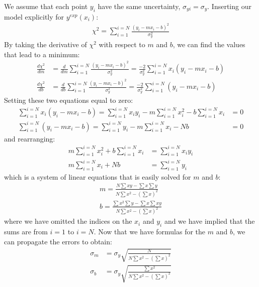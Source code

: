 We assume that each point $y_i$ have the same uncertainty, $ \sigma_{yi} = \sigma_y$. Inserting our model explicitly for $y^{exp}(x_i)$:
\begin{align}
\chi^2=\sum_{i=1}^{i=N}\frac{(y_i-mx_i-b)^2}{\sigma_{y}^2}
\end{align}
By taking the derivative of $\chi^2$ with respect to $m$ and $b$, we can find the values that lead to a minimum:
\begin{align}
\frac{d\chi^2}{dm}&=\frac{d}{dm}\sum_{i=1}^{i=N}\frac{(y_i-mx_i-b)^2}{\sigma_{y}^2}=\frac{-2}{\sigma_y^2}\sum_{i=1}^{i=N}x_i(y_i-mx_i-b)\\
\frac{d\chi^2}{db}&=\frac{d}{db}\sum_{i=1}^{i=N}\frac{(y_i-mx_i-b)^2}{\sigma_{y}^2}=\frac{-2}{\sigma_y^2}\sum_{i=1}^{i=N}(y_i-mx_i-b)
\end{align}
Setting these two equations equal to zero:
\begin{align}
\sum_{i=1}^{i=N}x_i(y_i-mx_i-b)=\sum_{i=1}^{i=N}x_iy_i-m\sum_{i=1}^{i=N}x_i^2-b\sum_{i=1}^{i=N}x_i&=0\\
\sum_{i=1}^{i=N}(y_i-mx_i-b)=\sum_{i=1}^{i=N}y_i-m\sum_{i=1}^{i=N}x_i-Nb&=0
\end{align}
and rearranging:
\begin{align}
m\sum_{i=1}^{i=N}x_i^2+b\sum_{i=1}^{i=N}x_i&=\sum_{i=1}^{i=N}x_iy_i\\
m\sum_{i=1}^{i=N}x_i+Nb&=\sum_{i=1}^{i=N}y_i
\end{align}
which is a system of linear equations that is easily solved for $m$ and $b$:
\begin{align}
\label{eqn:LSmb}
m=\frac{N\sum xy-\sum x\sum y}{N\sum x^2-\left(\sum x\right)^2}\nonumber\\
b=\frac{\sum x^2\sum y-\sum x \sum xy}{N\sum x^2-\left(\sum x\right)^2}
\end{align}
where we have omitted the indices on the $x_i$ and $y_i$ and we have implied that the sums are from $i=1$ to $i=N$. Now that we have formulas for the $m$ and $b$, we can propagate the errors to obtain:
\begin{align}
\label{eqn:LSmberror}
\sigma_m&=\sigma_y\sqrt{\frac{N}{N\sum x^2-\left(\sum x\right)^2}}\nonumber\\
\sigma_b&=\sigma_y\sqrt{\frac{\sum x^2}{N\sum x^2-\left(\sum x\right)^2}}
\end{align}

